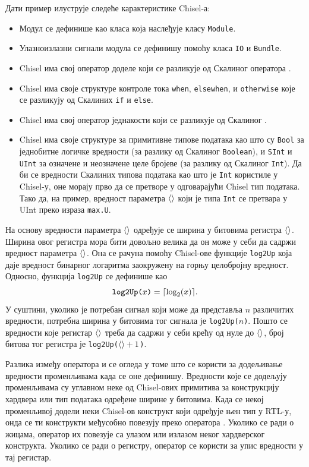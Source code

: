 \documentclass[master]{finthesis}
\newcommand*{\correctmath}[1]{%
    \ifcsname mathCorrectionFor#1\endcsname%
        \csname mathCorrectionFor#1\endcsname%
    \else%
        #1%
    \fi%
}
\newcommand*{\mfield}[1]{{\langle\correctmath{#1}\/\rangle}}
\newcommand*{\field}[1]{\texorpdfstring{$\mfield{#1}$}{⟨#1⟩}}
\newcommand*{\prog}[1]{\texttt{#1}}
\newcommand*{\op}[1]{\fbox{\prog{#1}}}
\newcommand*{\func}[1]{\prog{#1}}
\begin{document}
Дати пример илуструје следеће карактеристике Chisel-а:
\begin{itemize}
    \item Модул се дефинише као класа која наслеђује класу \prog{Module}.
    \item Улазно\Hyphdash излазни сигнали модула се дефинишу помоћу класа \prog{IO} и \prog{Bundle}.
    \item Chisel има свој оператор доделе \op{:=} који се разликује од Скалиног оператора \op{=}.
    \item Chisel има своје структуре контроле тока \prog{when}, \prog{elsewhen}, и \prog{otherwise} које се разликују од Скалиних \prog{if} и \prog{else}.
    \item Chisel има свој оператор једнакости \op{===} који се разликује од Скалиног \op{==}.
    \item Chisel има своје структуре за примитивне типове података као што су \prog{Bool} за једнобитне логичке вредности (за разлику од Скалиног \prog{Boolean}), и \prog{SInt} и \prog{UInt} за означене и неозначене целе бројеве (за разлику од Скалиног \prog{Int}). Да би се вредности Скалиних типова података као што је \prog{Int} користиле у Chisel-у, оне морају прво да се претворе у одговарајући Chisel тип података. Тако да, на пример, вредност параметра \field{max} који је типа \prog{Int} се претвара у UInt преко израза \prog{max.U}.
\end{itemize}

На основу вредности параметра \field{max} одређује се ширина у битовима регистра \field{counter}. Ширина овог регистра мора бити довољно велика да он може у себи да садржи вредност параметра \field{max}. Она се рачуна помоћу Chisel-ове функције \func{log2Up} која даје вредност бинарног логаритма заокружену на горњу целобројну вредност. Односно, функција \func{log2Up} се дефинише као $$\text{\func{log2Up($x$)}} = \lceil\log_2(x)\rceil.$$ У суштини, уколико је потребан сигнал који може да представља $n$ различитих вредности, потребна ширина у битовима тог сигнала је \func{log2Up($n$)}. Пошто се вредности које регистар \field{counter} треба да садржи у себи крећу од нуле до \field{max}, број битова тог регистра је \func{log2Up($\mfield{max} + 1$)}.

Разлика између оператора \op{=} и \op{:=} се огледа у томе што се \op{=} користи за додељивање вредности променљивама када се оне дефинишу. Вредности које се додељују променљивама су углавном неке од Chisel-ових примитива за конструкцију хардвера или тип података одређене ширине у битовима. Када се некој променљивој додели неки Chisel-ов конструкт који одређује њен тип у RTL-у, онда се ти конструкти међусобно повезују преко оператора \op{:=}. Уколико се ради о жицама, оператор \op{:=} их повезује са улазом или излазом неког хардверског конструкта. Уколико се ради о регистру, оператор \op{:=} се користи за упис вредности у тај регистар.
\end{document}
